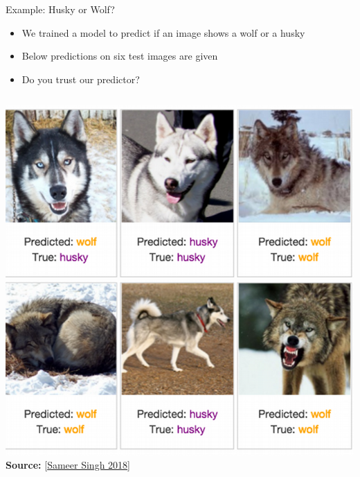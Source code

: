 \documentclass[11pt,compress,t,notes=noshow, aspectratio=169, xcolor=table]{beamer}
\begin{document}
\begin{frame}[t]{Example: Husky or Wolf?}
	\begin{itemize}
		\item We trained a model to predict if an image shows a wolf or a husky 
		\item Below predictions on six test images are given 
		\item Do you trust our predictor? 
	\end{itemize}
	
	\begin{columns}[T, onlytextwidth]
	
	\begin{column}{0.45\textwidth}
	    \centering
    		\includegraphics[width=\textwidth]{figure/lime-wolfhusky.png}\\
    		\includegraphics[width=\textwidth]{figure/lime-wolfhusky2.png}\\
    		{\textbf{Source:} [\href{http://www.facweb.iitkgp.ac.in/~niloy/COURSE/Spring2018/IntelligentSystem/PPT_2018/why_should_i_trust_ppt.pdf}{Sameer Singh 2018}]}
	    
	\end{column}
	

\end{columns}
\end{frame}
\end{document}
